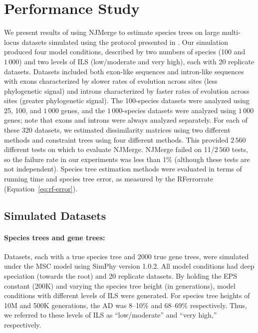 \section{Performance Study}
\label{sec:njmerge-study}
We present results of using NJMerge to estimate species trees on large multi-locus datasets simulated using the protocol presented in \cite{mirarab2015astral2}.
Our simulation produced four model conditions, described by two numbers of species (100 and $1\,000$) and two levels of ILS (low/moderate and very high), each with 20 replicate datasets.
Datasets included both \gls{exon}-like sequences and \gls{intron}-like sequences with exons characterized by slower rates of evolution across sites (less phylogenetic signal) and introns characterized by faster rates of evolution across sites (greater phylogenetic signal).
The 100-species datasets were analyzed using 25, 100, and $1\,000$ genes, and the $1\,000$-species datasets were analyzed using $1\,000$ genes; note that exons and introns were always analyzed separately.
For each of these 320 datasets, we estimated dissimilarity matrices using two different methods and constraint trees using four different methods.
This provided $2\,560$ different tests on which to evaluate NJMerge.
NJMerge failed on 11/$2\,560$ tests, so the failure rate in our experiments was less than 1\% (although these tests are not independent).
Species tree estimation methods were evaluated in terms of running time and species tree error, as measured by the \gls{RFerrorrate} (Equation~\ref{eq:rf-error}).

\subsection{Simulated Datasets}
\label{sec:njmerge-datasets}
\paragraph{Species trees and gene trees:} 
Datasets, each with a true species tree and 2000 true gene trees, were simulated under the MSC model using \gls{SimPhy} version 1.0.2.
All model conditions had deep speciation (towards the root) and 20 replicate datasets.
By holding the \gls{EPS} constant (200K) and varying the species tree height (in generations), model conditions with different levels of \gls{ILS} were generated.
For species tree heights of 10M and 500K generations, the \gls{AD} was 8--10\% and 68--69\% respectively.
Thus, we referred to these levels of ILS as ``low/moderate'' and ``very high,'' respectively.


